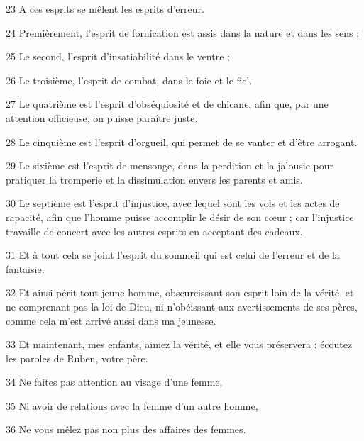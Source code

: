 \par 23 A ces esprits se mêlent les esprits d'erreur.

\par 24 Premièrement, l'esprit de fornication est assis dans la nature et dans les sens ;

\par 25 Le second, l'esprit d'insatiabilité dans le ventre ;

\par 26 Le troisième, l'esprit de combat, dans le foie et le fiel.

\par 27 Le quatrième est l'esprit d'obséquiosité et de chicane, afin que, par une attention officieuse, on puisse paraître juste.

\par 28 Le cinquième est l'esprit d'orgueil, qui permet de se vanter et d'être arrogant.

\par 29 Le sixième est l'esprit de mensonge, dans la perdition et la jalousie pour pratiquer la tromperie et la dissimulation envers les parents et amis.

\par 30 Le septième est l'esprit d'injustice, avec lequel sont les vols et les actes de rapacité, afin que l'homme puisse accomplir le désir de son cœur ; car l'injustice travaille de concert avec les autres esprits en acceptant des cadeaux.

\par 31 Et à tout cela se joint l'esprit du sommeil qui est celui de l'erreur et de la fantaisie.

\par 32 Et ainsi périt tout jeune homme, obscurcissant son esprit loin de la vérité, et ne comprenant pas la loi de Dieu, ni n'obéissant aux avertissements de ses pères, comme cela m'est arrivé aussi dans ma jeunesse.

\par 33 Et maintenant, mes enfants, aimez la vérité, et elle vous préservera : écoutez les paroles de Ruben, votre père.

\par 34 Ne faites pas attention au visage d'une femme,

\par 35 Ni avoir de relations avec la femme d'un autre homme,

\par 36 Ne vous mêlez pas non plus des affaires des femmes.

